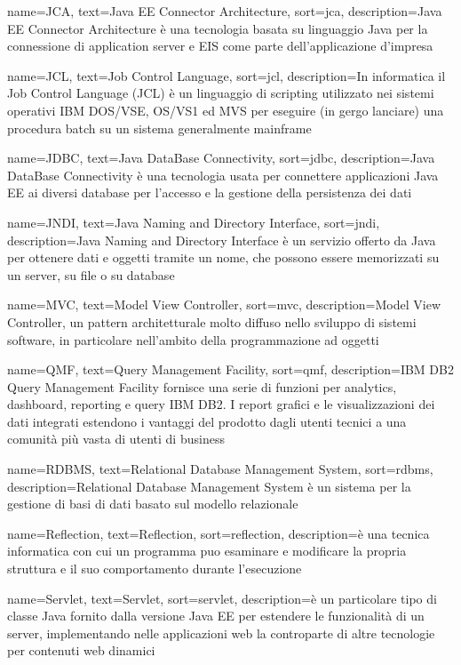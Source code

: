 {
    name=JCA,
    text=Java EE Connector Architecture,
    sort=jca,
    description={Java EE Connector Architecture è una tecnologia basata su linguaggio Java per la connessione di application server e EIS come parte dell'applicazione d'impresa}
}

{
    name=JCL,
    text=Job Control Language,
    sort=jcl,
    description={In informatica il Job Control Language (JCL) è un linguaggio di scripting utilizzato nei sistemi operativi IBM DOS/VSE, OS/VS1 ed MVS per eseguire (in gergo lanciare) una procedura batch su un sistema generalmente mainframe}
}

{
    name=JDBC,
    text=Java DataBase Connectivity,
    sort=jdbc,
    description={Java DataBase Connectivity è una tecnologia usata per connettere applicazioni Java EE ai diversi database per l'accesso e la gestione della persistenza dei dati}
}


{
    name=JNDI,
    text=Java Naming and Directory Interface,
    sort=jndi,
    description={Java Naming and Directory Interface è un servizio offerto da Java per ottenere dati e oggetti tramite un nome, che possono essere memorizzati su un server, su file o su database}
}

{
    name=MVC,
    text=Model View Controller,
    sort=mvc,
    description={Model View Controller, un pattern architetturale molto diffuso nello sviluppo di sistemi software, in particolare nell’ambito della programmazione ad oggetti}
}

{
    name=QMF,
    text=Query Management Facility,
    sort=qmf,
    description={IBM DB2 Query Management Facility fornisce una serie di funzioni per analytics, dashboard, reporting e query IBM DB2. I report grafici e le visualizzazioni dei dati integrati estendono i vantaggi del prodotto dagli utenti tecnici a una comunità più vasta di utenti di business}
}


{
    name=RDBMS,
    text=Relational Database Management System,
    sort=rdbms,
    description={Relational Database Management System è un sistema per la gestione di basi di dati basato sul modello relazionale}
}


{
    name=Reflection,
    text=Reflection,
    sort=reflection,
    description={è una tecnica informatica con cui un programma puo esaminare e modificare la propria struttura e il suo comportamento durante l'esecuzione}
}

{
    name=Servlet,
    text=Servlet,
    sort=servlet,
    description={è un particolare tipo di classe Java fornito dalla versione Java EE per estendere le funzionalità di un server, implementando nelle applicazioni web la controparte	di altre tecnologie per contenuti web dinamici}
}
